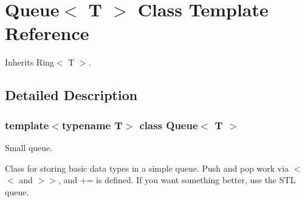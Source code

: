 \section{Queue$<$ T $>$ Class Template Reference}
\label{classQueue}
Inherits Ring$<$ T $>$.



\subsection{Detailed Description}
\subsubsection*{template$<$typename T$>$ class Queue$<$ T $>$}

Small queue. 

Class for storing basic data types in a simple queue. Push and pop work via $<$$<$ and $>$$>$, and += is defined. If you want something better, use the STL queue. 